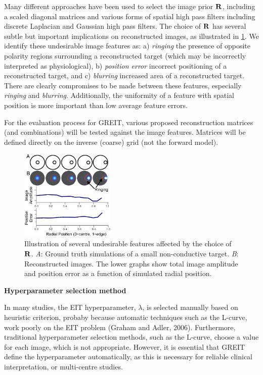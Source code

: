 \documentclass[letterpaper,twocolumn,11pt]{article}
\newcommand{\RB}{\mbox{$\bf R$}}
\begin{document}
\begin{list}{\bf {}.}
Many different approaches have been used to select
the image prior $\RB$, including a scaled diagonal
matrices and various forms of spatial high pass
filters including discrete Laplacian and Gaussian
high pass filters. The choice of $\RB$ has several
subtle but important implications on reconstructed
images, as illustrated in \ref{fig:prior_effects}.
We identify these undesirable image features as:
a) {\em ringing} the presence of opposite polarity
regions surrounding a reconstructed target (which
may be incorrectly interpreted as physiological),
b) {\em position error} incorrect positioning of
a reconstructed target,
and 
c) {\em blurring} increased area of a reconstructed
target.
There are clearly compromises to be made between
these features, especially {\em ringing} and
{\em blurring}. Additionally, the uniformity of
a feature with spatial position is more important
than low average feature errors.

For the evaluation process for GREIT, various
proposed reconstruction matrices (and combinations)
will be tested against the image features. Matrices
will be defined directly on the inverse (coarse) grid
(not the forward model).


\begin{figure}[tbh]
\begin{center}
 \includegraphics[width= 0.4\textwidth, bb=0 0 512 532]{figs/spatial-uniformity.png}
\caption{ \label{fig:prior_effects}
Illustration of several undesirable features affected by the
choice of $\RB$. {\em A}: Ground truth simulations of a small
non-conductive target. {\em B}: Reconstructed images. The
lower graphs show total image amplitude and position error
as a function of simulated radial position.%
}
\end{center}
\end{figure}

\item {\bf Hyperparameter selection method}

In many studies, the EIT hyperparameter, $\lambda$, is selected
manually based on heuristic criterion, probaby because
automatic techniques such as the L-curve, work poorly
on the EIT problem (Graham and Adler, 2006).  Furthermore,
traditional hyperparameter selection methods, such as the L-curve,
choose a value for each image, which is not appropriate.
 However, it
is essential that GREIT define the hyperparameter 
automatically, as this is necessary for reliable
clinical interpretation, or multi-centre studies.


\end{list}
\end{document}
